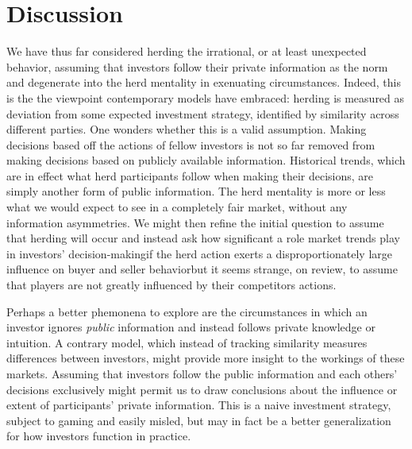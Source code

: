 \documentclass{article}
\begin{document}
\section{Discussion}
We have thus far considered herding the irrational, or at least unexpected behavior, assuming that investors follow their private information as the norm and degenerate into the herd mentality in exenuating circumstances.
Indeed, this is the the viewpoint contemporary models have embraced: herding is measured as deviation from some expected investment strategy, identified by similarity across different parties. 
One wonders whether this is a valid assumption. 
Making decisions based off the actions of fellow investors is not so far removed from making decisions based on publicly available information.
Historical trends, which are in effect what herd participants follow when making their decisions, are simply another form of public information. 
The herd mentality is more or less what we would expect to see in a completely fair market, without any information asymmetries. 
We might then refine the initial question to assume that herding will occur and instead ask how significant a role market trends play in investors' decision-making\textemdash if the herd action exerts a disproportionately large influence on buyer and seller behavior\textemdash but it seems strange, on review, to assume that players are not greatly influenced by their competitors actions.

Perhaps a better phemonena to explore are the circumstances in which an investor ignores \emph{public} information and instead follows private knowledge or intuition.
A contrary model, which instead of tracking similarity measures differences between investors, might provide more insight to the workings of these markets.  
Assuming that investors follow the public information and each others' decisions exclusively might permit us to draw conclusions about the influence or extent of participants' private information.
This is a naive investment strategy, subject to gaming and easily misled, but may in fact be a better generalization for how investors function in practice.
\end{document}
